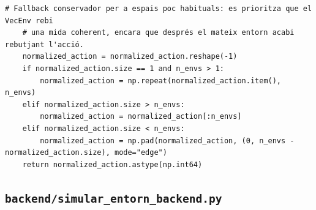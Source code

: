 \documentclass[10pt,a4paper]{article}
\begin{document}
\begin{lstlisting}[style=studioPython,caption={backend/sb3\_utils.py},label={lst:backend-sb3-utils-py}]
    # Fallback conservador per a espais poc habituals: es prioritza que el VecEnv rebi
    # una mida coherent, encara que després el mateix entorn acabi rebutjant l'acció.
    normalized_action = normalized_action.reshape(-1)
    if normalized_action.size == 1 and n_envs > 1:
        normalized_action = np.repeat(normalized_action.item(), n_envs)
    elif normalized_action.size > n_envs:
        normalized_action = normalized_action[:n_envs]
    elif normalized_action.size < n_envs:
        normalized_action = np.pad(normalized_action, (0, n_envs - normalized_action.size), mode="edge")
    return normalized_action.astype(np.int64)
\end{lstlisting}


\subsection{\texorpdfstring{\texttt{backend/simular\_entorn\_backend.py}}{backend/simular\_entorn\_backend.py}}
\end{document}
